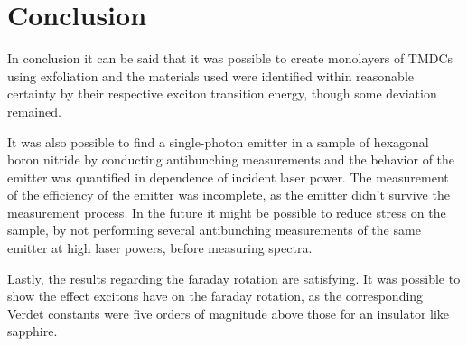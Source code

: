 \newpage
\section{Conclusion}


  In conclusion it can be said that it was possible to create monolayers of TMDCs using exfoliation and the materials used were identified within reasonable certainty by their respective exciton transition energy, though some deviation remained.

  It was also possible to find a single-photon emitter in a sample of hexagonal boron nitride by conducting antibunching measurements and the behavior of the emitter was quantified in dependence of incident laser power.
  The measurement of the efficiency of the emitter was incomplete, as the emitter didn't survive the measurement process.
  In the future it might be possible to reduce stress on the sample, by not performing several antibunching measurements of the same emitter at high laser powers, before measuring spectra.

  Lastly, the results regarding the faraday rotation are satisfying. It was possible to show the effect excitons have on the faraday rotation, as the corresponding Verdet constants were five orders of magnitude above those for an insulator like sapphire.
